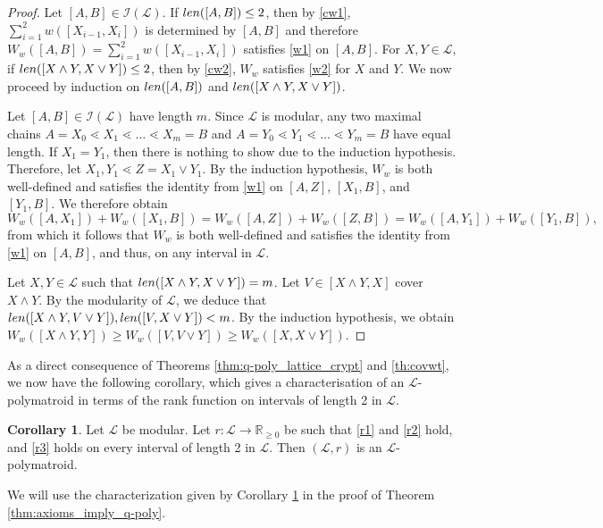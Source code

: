 \documentclass[a4paper,11pt,reqno]{article}
\theoremstyle{definition}
\newtheorem{corollary}[theorem]{{{Corollary}}}
\newcommand{\mL}{\mathcal{L}}
\newcommand{\len}{\textup{len}}
\begin{document}
\begin{proof}
    Let $[A,B]\in\mathcal{I}(\mathcal{L})$. If $\textup{len}([A,B])\leq 2$, then by \ref{cw1}, $\sum_{i=1}^2w([X_{i-1},X_i])$ is determined by $[A,B]$ and therefore $W_w([A,B])=\sum_{i=1}^2w([X_{i-1},X_i])$ satisfies \ref{w1} on $[A,B]$. For $X,Y\in\mathcal{L}$, if $\textup{len}([X\wedge Y,X\vee Y])\leq 2$, then by \ref{cw2}, $W_w$ satisfies \ref{w2} for $X$ and $Y$. We now proceed by induction on $\textup{len}([A,B])$ and $\textup{len}([X\wedge Y,X\vee Y])$.

    
    Let $[A,B]\in\mathcal{I}(\mathcal{L})$ have length $m$. Since $\mathcal{L}$ is modular, any two maximal chains $A=X_0\lessdot X_1\lessdot\dots\lessdot X_m=B$ and $A=Y_0\lessdot Y_1\lessdot\dots\lessdot Y_m=B$ have equal length. If $X_1=Y_1$, then there is nothing to show due to the induction hypothesis. Therefore, let $X_1,Y_1\lessdot Z=X_1\vee Y_1$. By the induction hypothesis, $W_w$ is both well-defined and satisfies the identity from \ref{w1} on $[A,Z]$, $[X_1,B]$, and $[Y_1,B]$. We therefore obtain
    $$W_w([A,X_1])+W_w([X_1,B])=W_w([A,Z])+W_w([Z,B])=W_w([A,Y_1])+W_w([Y_1,B]),$$
    from which it follows that $W_w$ is both well-defined and satisfies the identity from \ref{w1} on $[A,B]$, and thus, on any interval in $\mathcal{L}$.

    Let $X,Y\in\mathcal{L}$ such that $\textup{len}([X\wedge Y,X\vee Y])=m$. Let $V\in[X\wedge Y,X]$ cover $X\wedge Y$. By the modularity of $\mathcal{L}$, we deduce that $\len([X\wedge Y, V\vee Y]),\len([V,X\vee Y])<m$. By the induction hypothesis, we obtain $W_w([X\wedge Y,Y])\geq W_w([V,V\vee Y])\geq W_w([X,X\vee Y])$.
\end{proof}

As a direct consequence of Theorems \ref{thm:q-poly_lattice_crypt} and \ref{th:covwt}, we now have the following corollary, which gives a characterisation of an $\mL$-polymatroid in terms of the rank function on intervals of length 2 in $\mL$.

\begin{corollary}\label{cor:int2}
    Let $\mL$ be modular. Let $r:\mL \to \mathbb{R}_{\geq 0}$ be such that \ref{r1} and \ref{r2} hold, and \ref{r3} holds on every interval of length 2 in $\mL$. Then $(\mL,r)$ is an $\mL$-polymatroid.
\end{corollary}

We will use the characterization given by Corollary \ref{cor:int2} in the proof of Theorem \ref{thm:axioms_imply_q-poly}.
\end{document}
